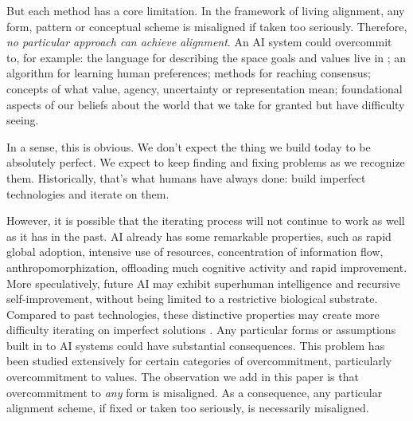 \documentclass[12pt]{article}
\begin{document}
But each method has a core limitation. In the framework of living alignment, any form, pattern or conceptual scheme is misaligned if taken too seriously. Therefore, \textit{no particular approach can achieve alignment}. An AI system could overcommit to, for example: the language for describing the space goals and values live in \citep{bobu2020quantifying, soares2014aligning}; an algorithm for learning human preferences; methods for reaching consensus; concepts of what value, agency, uncertainty or representation mean; foundational aspects of our beliefs about the world that we take for granted but have difficulty seeing. 


In a sense, this is obvious. We don't expect the thing we build today to be absolutely perfect. We expect to keep finding and fixing problems as we recognize them. Historically, that's what humans have always done: build imperfect technologies and iterate on them.

However, it is possible that the iterating process will not continue to work as well as it has in the past. AI already has some remarkable properties, such as rapid global adoption, intensive use of resources, concentration of information flow, anthropomorphization, offloading much cognitive activity and rapid improvement. More speculatively, future AI may exhibit superhuman intelligence and recursive self-improvement, without being limited to a restrictive biological substrate. Compared to past technologies, these distinctive properties may create more difficulty iterating on imperfect solutions \citep{bostrom2014superintelligence}. Any particular forms or assumptions built in to AI systems could have substantial consequences. This problem has been studied extensively for certain categories of overcommitment, particularly overcommitment to values. The observation we add in this paper is that overcommitment to \textit{any} form is misaligned. As a consequence, any particular alignment scheme, if fixed or taken too seriously, is necessarily misaligned. 
\end{document}
